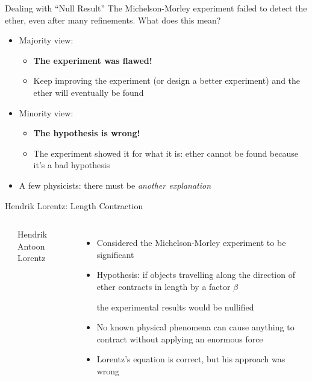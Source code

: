 \documentclass[12pt,compress,aspectratio=169]{beamer}
\newcommand{\bigsqrt}{\ensuremath\sqrt{1-\left(\dfrac vc\right)^2}}
\begin{document}
\begin{frame}{Dealing with ``Null Result''}
  The Michelson-Morley experiment failed to detect the ether, even after many
  refinements. What does this mean?
  \begin{itemize}
  \item Majority view:
    \begin{itemize}
    \item\textbf{The experiment was flawed!}
    \item Keep improving the experiment (or design a better experiment) and the
      ether will eventually be found
    \end{itemize}
  \item Minority view:
    \begin{itemize}
    \item\textbf{The hypothesis is wrong!}
    \item The experiment showed it for what it is: ether cannot be found
      because it's a bad hypothesis
    \end{itemize}
  \item A few physicists: there must be \emph{another explanation}
  \end{itemize}
\end{frame}



\begin{frame}{Hendrik Lorentz: Length Contraction}
  \begin{columns}
    \centering
    \\    
    {\scriptsize Hendrik Antoon Lorentz\par}  

    \begin{itemize}
    \item Considered the Michelson-Morley experiment to be significant
    \item Hypothesis: if objects travelling along the direction of ether
      contracts in length by a factor $\beta$
      
      \eq{-.1in}{
        \boxed{\beta=\bigsqrt}
      }

      \vspace{-.05in}the experimental results would be nullified
    \item No known physical phenomena can cause anything to contract without
      applying an enormous force
    \item Lorentz's equation is correct, but his approach was wrong
    \end{itemize}
  \end{columns}
\end{frame}
\end{document}
